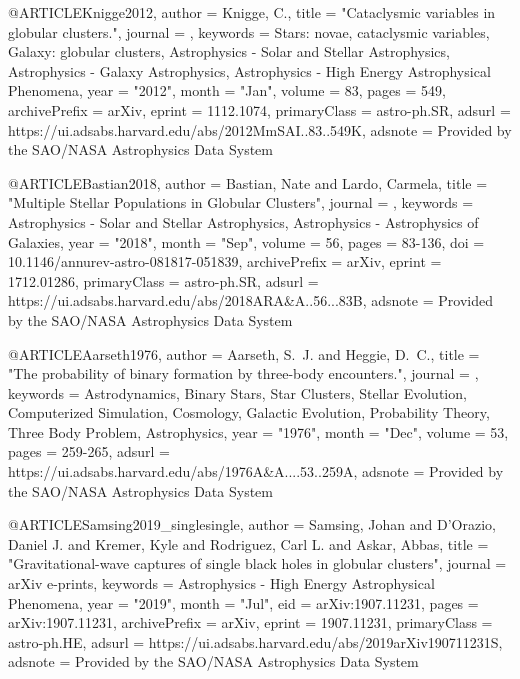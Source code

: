 \documentclass[twocolumn,tighten]{aastex63}
\begin{document}
{@ARTICLE{Knigge2012,
       author = {{Knigge}, C.},
        title = "{Cataclysmic variables in globular clusters.}",
      journal = {\memsai},
     keywords = {Stars: novae, cataclysmic variables, Galaxy: globular clusters, Astrophysics - Solar and Stellar Astrophysics, Astrophysics - Galaxy Astrophysics, Astrophysics - High Energy Astrophysical Phenomena},
         year = "2012",
        month = "Jan",
       volume = {83},
        pages = {549},
archivePrefix = {arXiv},
       eprint = {1112.1074},
 primaryClass = {astro-ph.SR},
       adsurl = {https://ui.adsabs.harvard.edu/abs/2012MmSAI..83..549K},
      adsnote = {Provided by the SAO/NASA Astrophysics Data System}
}

@ARTICLE{Bastian2018,
       author = {{Bastian}, Nate and {Lardo}, Carmela},
        title = "{Multiple Stellar Populations in Globular Clusters}",
      journal = {\araa},
     keywords = {Astrophysics - Solar and Stellar Astrophysics, Astrophysics - Astrophysics of Galaxies},
         year = "2018",
        month = "Sep",
       volume = {56},
        pages = {83-136},
          doi = {10.1146/annurev-astro-081817-051839},
archivePrefix = {arXiv},
       eprint = {1712.01286},
 primaryClass = {astro-ph.SR},
       adsurl = {https://ui.adsabs.harvard.edu/abs/2018ARA&A..56...83B},
      adsnote = {Provided by the SAO/NASA Astrophysics Data System}
}

@ARTICLE{Aarseth1976,
       author = {{Aarseth}, S.~J. and {Heggie}, D.~C.},
        title = "{The probability of binary formation by three-body encounters.}",
      journal = {\aap},
     keywords = {Astrodynamics, Binary Stars, Star Clusters, Stellar Evolution, Computerized Simulation, Cosmology, Galactic Evolution, Probability Theory, Three Body Problem, Astrophysics},
         year = "1976",
        month = "Dec",
       volume = {53},
        pages = {259-265},
       adsurl = {https://ui.adsabs.harvard.edu/abs/1976A&A....53..259A},
      adsnote = {Provided by the SAO/NASA Astrophysics Data System}
}

@ARTICLE{Samsing2019_singlesingle,
       author = {{Samsing}, Johan and {D'Orazio}, Daniel J. and {Kremer}, Kyle and
         {Rodriguez}, Carl L. and {Askar}, Abbas},
        title = "{Gravitational-wave captures of single black holes in globular clusters}",
      journal = {arXiv e-prints},
     keywords = {Astrophysics - High Energy Astrophysical Phenomena},
         year = "2019",
        month = "Jul",
          eid = {arXiv:1907.11231},
        pages = {arXiv:1907.11231},
archivePrefix = {arXiv},
       eprint = {1907.11231},
 primaryClass = {astro-ph.HE},
       adsurl = {https://ui.adsabs.harvard.edu/abs/2019arXiv190711231S},
      adsnote = {Provided by the SAO/NASA Astrophysics Data System}
}

}
\end{document}
